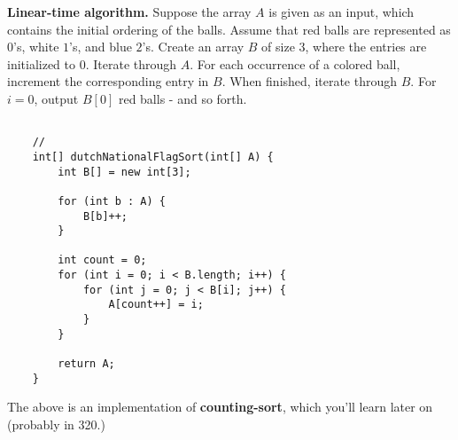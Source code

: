 \textbf{Linear-time algorithm.} Suppose the array $A$ is given as an input, which contains the initial ordering of the balls. Assume that red balls are represented as $0$'s, white $1$'s, and blue $2$'s. Create an array $B$ of size $3$, where the entries are initialized to $0$. Iterate through $A$. For each occurrence of a colored ball, increment the corresponding entry in $B$. When finished, iterate through $B$. For $i=0$, output $B[0]$ red balls - and so forth.\\

\begin{verbatim}

    //
    int[] dutchNationalFlagSort(int[] A) {
        int B[] = new int[3];

        for (int b : A) {
            B[b]++;
        }

        int count = 0;
        for (int i = 0; i < B.length; i++) {
            for (int j = 0; j < B[i]; j++) {
                A[count++] = i;
            }
        }

        return A;
    }
\end{verbatim}
\mbox{}\vspace{20pt}

The above is an implementation of \textbf{counting-sort}, which you'll learn later on (probably in 320.)
